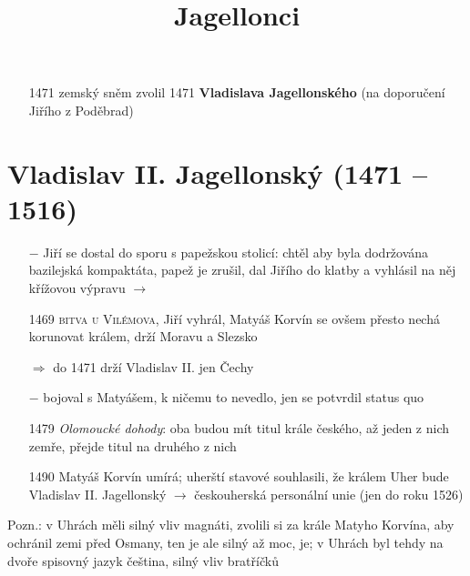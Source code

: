 \documentclass{article}
\title{\vspace{-2cm}Jagellonci\vspace{-1.7cm}}
\date{}
\author{}
\begin{document}
\maketitle

\begin{itemize}
    \vspace{-0.5em}
    \setlength\itemsep{0.15em}
    \item[1471] zemský sněm zvolil 1471 \textbf{Vladislava Jagellonského} (na doporučení Jiřího z Poděbrad)
\end{itemize}

\section*{Vladislav II. Jagellonský (1471 – 1516)}
\begin{itemize}
    \vspace{-0.5em}
    \setlength\itemsep{0.15em}
    \item[$-$] Jiří se dostal do sporu s papežskou stolicí: chtěl aby byla dodržována bazilejská kompaktáta, papež je zrušil, dal Jiřího do klatby a vyhlásil na něj křížovou výpravu $\rightarrow$
    \item[1469] \textsc{bitva u Vilémova}, Jiří vyhrál, Matyáš Korvín se ovšem přesto nechá korunovat králem, drží Moravu a Slezsko
    \item[$\Rightarrow$] do 1471 drží Vladislav II. jen Čechy
    \item[$-$] bojoval s Matyášem, k ničemu to nevedlo, jen se potvrdil status quo
    \item[1479] \textit{Olomoucké dohody}: oba budou mít titul krále českého, až jeden z nich zemře, přejde titul na druhého z nich
    \item[1490] Matyáš Korvín umírá; uherští stavové souhlasili, že králem Uher bude Vladislav II. Jagellonský $\rightarrow$ českouherská personální unie (jen do roku 1526)
    \end{itemize}

\noindent Pozn.: v Uhrách měli silný vliv magnáti, zvolili si za krále Matyho Korvína, aby ochránil zemi před Osmany, ten je ale silný až moc,  je; v Uhrách byl tehdy na dvoře spisovný jazyk čeština, silný vliv bratříčků
\end{document}
